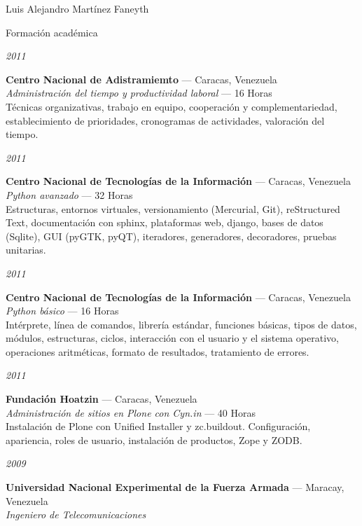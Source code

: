 \documentclass[11pt,letterpaper]{article}
\begin{document}
\begin{cv}{Luis Alejandro Mart\'inez Faneyth}
\begin{cvlist}{Formaci\'on acad\'emica}
\item[{\parbox[t]{6em}{\textit{\large{2011}}}}]{
	\parbox[t]{\linewidth}{
		\textbf{Centro Nacional de Adistramiemto} --- Caracas, Venezuela\\
		\textit{Administraci\'on del tiempo y productividad laboral} --- 16 Horas\\
		\footnotesize{T\'ecnicas organizativas, trabajo en equipo, cooperaci\'on y complementariedad, establecimiento de prioridades, cronogramas de actividades, valoraci\'on del tiempo.}
	}
}
\item[{\parbox[t]{6em}{\textit{\large{2011}}}}]{
	\parbox[t]{\linewidth}{
		\textbf{Centro Nacional de Tecnolog\'ias de la Informaci\'on} --- Caracas, Venezuela\\
		\textit{Python avanzado} --- 32 Horas\\
		\footnotesize{Estructuras, entornos virtuales, versionamiento (Mercurial, Git), reStructured Text, documentaci\'on con sphinx, plataformas web, django, bases de datos (Sqlite), GUI (pyGTK, pyQT), iteradores, generadores, decoradores, pruebas unitarias.}
	}
}
\item[{\parbox[t]{6em}{\textit{\large{2011}}}}]{
	\parbox[t]{\linewidth}{
		\textbf{Centro Nacional de Tecnolog\'ias de la Informaci\'on} --- Caracas, Venezuela\\
		\textit{Python b\'asico} --- 16 Horas\\
		\footnotesize{Int\'erprete, l\'inea de comandos, librer\'ia est\'andar, funciones b\'asicas, tipos de datos, m\'odulos, estructuras, ciclos, interacci\'on con el usuario y el sistema operativo, operaciones aritm\'eticas, formato de resultados, tratamiento de errores.}
	}
}
\item[{\parbox[t]{6em}{\textit{\large{2011}}}}]{
	\parbox[t]{\linewidth}{
		\textbf{Fundaci\'on Hoatzin} --- Caracas, Venezuela\\
		\textit{Administraci\'on de sitios en Plone con Cyn.in} --- 40 Horas\\
		\footnotesize{Instalaci\'on de Plone con Unified Installer y zc.buildout. Configuraci\'on, apariencia, roles de usuario, instalaci\'on de productos, Zope y ZODB.}
	}
}
\item[{\parbox[t]{6em}{\textit{\large{2009}}}}]{
	\parbox[t]{\linewidth}{
		\textbf{Universidad Nacional Experimental de la Fuerza Armada} --- Maracay, Venezuela\\
		\textit{Ingeniero de Telecomunicaciones}
	}
}
\end{cvlist}


\end{cv}
\end{document}
